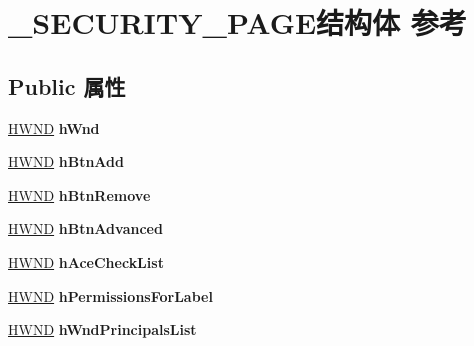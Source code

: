\hypertarget{struct___s_e_c_u_r_i_t_y___p_a_g_e}{}\section{\+\_\+\+S\+E\+C\+U\+R\+I\+T\+Y\+\_\+\+P\+A\+G\+E结构体 参考}
\label{struct___s_e_c_u_r_i_t_y___p_a_g_e}
\subsection*{Public 属性}
\begin{DoxyCompactItemize}
\item 
\mbox{\label{struct___s_e_c_u_r_i_t_y___p_a_g_e_a420f3bd7f4dcbfe1710b06d42162b262}} 
\hyperlink{interfacevoid}{H\+W\+ND} {\bfseries h\+Wnd}
\item 
\mbox{\label{struct___s_e_c_u_r_i_t_y___p_a_g_e_abbd7f1093432e056ad8c8573d827ceb7}} 
\hyperlink{interfacevoid}{H\+W\+ND} {\bfseries h\+Btn\+Add}
\item 
\mbox{\label{struct___s_e_c_u_r_i_t_y___p_a_g_e_af763db725ab9e8da975757ed056a1a6c}} 
\hyperlink{interfacevoid}{H\+W\+ND} {\bfseries h\+Btn\+Remove}
\item 
\mbox{\label{struct___s_e_c_u_r_i_t_y___p_a_g_e_a272cc3aeab24a40e37602ea2e377a596}} 
\hyperlink{interfacevoid}{H\+W\+ND} {\bfseries h\+Btn\+Advanced}
\item 
\mbox{\label{struct___s_e_c_u_r_i_t_y___p_a_g_e_ae66e2f47d2e763f11e8cea6e11e57e74}} 
\hyperlink{interfacevoid}{H\+W\+ND} {\bfseries h\+Ace\+Check\+List}
\item 
\mbox{\label{struct___s_e_c_u_r_i_t_y___p_a_g_e_abf2d11b7d2870d5113961ee5314e025a}} 
\hyperlink{interfacevoid}{H\+W\+ND} {\bfseries h\+Permissions\+For\+Label}
\item 
\mbox{\label{struct___s_e_c_u_r_i_t_y___p_a_g_e_a13a3e186e0161c1f506af5cb194299c1}} 
\hyperlink{interfacevoid}{H\+W\+ND} {\bfseries h\+Wnd\+Principals\+List}

\end{DoxyCompactItemize}
